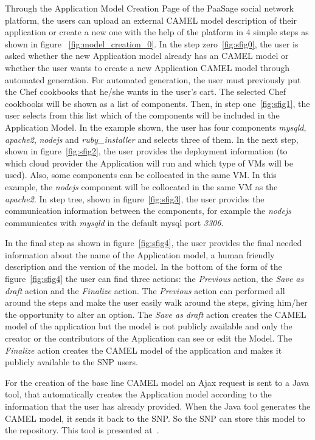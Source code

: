 Through the Application Model Creation Page of the PaaSage social network platform, the users can upload an external CAMEL model description of their application or create a new one with the help of the platform in 4 simple steps as shown in figure ~\ref{fig:model_creation_0}. In the step zero~\ref{fig:sfig0}, the user is asked whether the new Application model already has an CAMEL model or whether the user wants to create a new Application CAMEL model through automated generation. For automated generation, the user must previously put the Chef cookbooks that he/she wants in the user's cart. The selected Chef cookbooks will be shown as a list of components. Then, in step one~\ref{fig:sfig1}, the user selects from this list which of the components will be included in the Application Model. 
In the example shown, the user has four components {\it mysqld}, {\it apache2}, {\it nodejs} and 
{\it ruby\_installer} and selects three of them. In the next step, shown in figure~\ref{fig:sfig2}, the user provides the deployment information (to which cloud provider the Application will run and which type of VMs will be used). Also, some components can be collocated in the same VM. In this example, the {\it nodejs} component will be collocated in the same VM as the {\it apache2}. In step tree, shown in figure~\ref{fig:sfig3}, the user provides the communication information between the components, for example the 
{\it nodejs} communicates with {\it mysqld} in the default mysql port {\it 3306}.

In the final step as shown in figure~\ref{fig:sfig4}, the user provides the final needed information about the name of the Application model, a human friendly description and the version of the model. In the bottom of the form of the figure~\ref{fig:sfig4} the user can find three actions: the \emph{Previous} action, the \emph{Save as draft} action and the \emph{Finalize} action. The \emph{Previous} action can performed all around the steps and make the user easily walk around the steps, giving him/her the opportunity to alter an option. The \emph{Save as draft} action creates the CAMEL model of the application but the model is not publicly available and only the creator or the contributors of the Application can see or edit the Model. The \emph{Finalize} action creates the CAMEL model of the application and makes it publicly available to the SNP users. 

For the creation of the base line CAMEL model an Ajax request is sent to a Java tool, that automatically creates the Application model according to the information that the user has already provided. When the Java tool generates the CAMEL model, it sends it back to the SNP. So the SNP can store this model to the repository. This tool is presented at~\cite{papoutsakis2014reducing}. 

